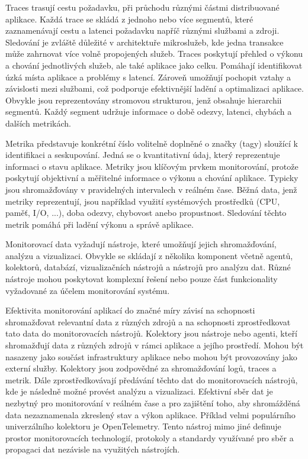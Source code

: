 
Traces trasují cestu požadavku, při průchodu různými částmi distribuované aplikace. Každá trace se skládá z jednoho nebo více segmentů, které zaznamenávají cestu a latenci požadavku napříč různými službami a zdroji. Sledování je zvláště důležité v architektuře mikroslužeb, kde jedna transakce může zahrnovat více volně propojených služeb. Traces poskytují přehled o výkonu a chování jednotlivých služeb, ale také aplikace jako celku. Pomáhají identifikovat úzká místa aplikace a problémy s latencí. \cite{Molkova2023} Zároveň umožňují pochopit vztahy a závislosti mezi službami, což podporuje efektivnější ladění a optimalizaci aplikace. Obvykle jsou reprezentovány stromovou strukturou, jenž obsahuje hierarchii segmentů. Každý segment udržuje informace o době odezvy, latenci, chybách a dalších metrikách. \cite{Molkova2023}


Metrika představuje konkrétní číslo volitelně doplněné o značky (tagy) sloužící k identifikaci a seskupování. \cite{Majors2022} Jedná se o kvantitativní údaj, který reprezentuje informaci o stavu aplikace. Metriky jsou klíčovým prvkem monitorování, protože poskytují objektivní a měřitelné informace o výkonu a chování aplikace. Typicky jsou shromažďovány v pravidelných intervalech v reálném čase. Běžná data, jenž metriky reprezentují, jsou například využití systémových prostředků (CPU, paměť, I/O, ...), doba odezvy, chybovost anebo propustnost. Sledování těchto metrik pomáhá při ladění výkonu a správě aplikace.


Monitorovací data vyžadují nástroje, které umožňují jejich shromažďování, analýzu a vizualizaci. Obvykle se skládají z několika komponent včetně agentů, kolektorů, databází, vizualizačních nástrojů a nástrojů pro analýzu dat. \cite{Riedesel2021} Různé nástroje mohou poskytovat komplexní řešení nebo pouze část funkcionality vyžadované za účelem monitorování systému.


Efektivita monitorování aplikací do značné míry závisí na schopnosti shromažďovat relevantní data z různých zdrojů a na schopnosti zprostředkovat tato data do monitorovacích nástrojů. Kolektory jsou nástroje nebo agenti, kteří shromažďují data z různých zdrojů v rámci aplikace a jejího prostředí. \cite{Blanco2023} Mohou být nasazeny jako součást infrastruktury aplikace nebo mohou být provozovány jako externí služby. Kolektory jsou zodpovědné za shromažďování logů, traces a metrik. Dále zprostředkovávají předávání těchto dat do monitorovacích nástrojů, kde je následně možné provést analýzu a vizualizaci. Efektivní sběr dat je nezbytný pro monitorování v reálném čase a pro zajištění toho, aby shromážděná data nezaznamenala zkreslený stav a výkon aplikace. Příklad velmi populárního univerzálního kolektoru je OpenTelemetry. Tento nástroj mimo jiné definuje prostor monitorovacích technologií, protokoly a standardy využívané pro sběr a propagaci dat nezávisle na využitých nástrojích. \cite{Blanco2023}

